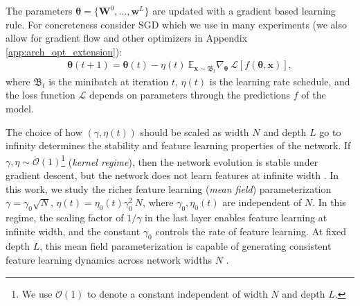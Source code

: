 \documentclass{article} %
\def\x{\bm x}
\def\w{\bm w}
\def\W{\bm W}
\newcommand{\cp}[1]{\fTBD{{\textcolor{blue}[CP: #1]}}}
\begin{document}
% 
% 
The parameters $\bm\theta = \{ \W^0 ,...,\w^L \}$ are updated with a gradient based learning rule. For concreteness consider SGD which we use in many experiments (we also allow for gradient flow and other optimizers in Appendix \ref{app:arch_opt_extension}): 
% 
\begin{align}
    \bm\theta(t+1)= \bm\theta(t) - \eta(t) \ \mathbb{E}_{\x \sim \mathfrak B_t} \nabla_{\bm 
    \theta} \ \mathcal{L}[f(\bm\theta, \x)] ,
\end{align}
% 
where $\mathfrak B_t$ is the minibatch at iteration $t$, $\eta(t)$ is the learning rate schedule, and the loss function $\mathcal{L}$ depends on parameters through the predictions $f$ of the model. 

% 


The choice of how $(\gamma, \eta(t))$ should be scaled as width $N$ and depth $L$ go to infinity determines the stability and feature learning properties of the network. 
% 
If $\gamma,\eta \sim \mathcal{O}(1)$\footnote{We use $\mathcal{O}(1)$ to denote a constant independent of width $N$ and depth $L$.} (\emph{kernel regime}), then the network evolution is stable under gradient descent, but the network does not learn features at infinite width \citep{jacot2018neural, lee2019wide, yang2021tensor}. 
% 
In this work, we study the richer feature learning (\emph{mean field}) parameterization $\gamma = \gamma_0 \sqrt{N}$, $\eta(t) = \eta_0(t)  \gamma_0^2 \ N$, where $\gamma_0, \eta_0(t)$ are independent of $N$. 
% 
In this regime, the scaling factor of $1/\gamma$ in the last layer enables feature learning at infinite width, and the constant $\gamma_0$ controls the rate of feature learning. 
% 
At fixed depth $L$, this mean field parameterization is capable of generating consistent feature learning dynamics across network widths $N$ \citep{yang2021tensor, bordelon2022self}. 
\end{document}
